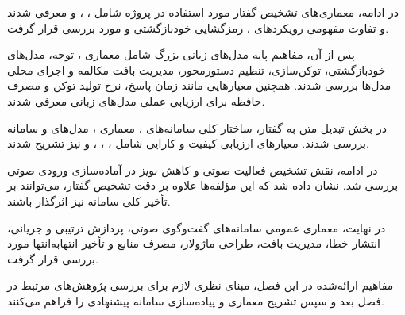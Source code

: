 در ادامه، معماری‌های تشخیص گفتار مورد استفاده در پروژه شامل
، ، 
و  معرفی شدند و تفاوت مفهومی
رویکردهای ، رمزگشایی خودبازگشتی و
 مورد بررسی قرار گرفت.

پس از آن، مفاهیم پایه مدل‌های زبانی بزرگ شامل معماری
، توجه، مدل‌های خودبازگشتی، توکن‌سازی،
تنظیم دستورمحور، مدیریت بافت مکالمه و اجرای محلی مدل‌ها
بررسی شدند.
همچنین معیارهایی مانند زمان پاسخ، نرخ تولید توکن و مصرف
حافظه برای ارزیابی عملی مدل‌های زبانی معرفی شدند.

در بخش تبدیل متن به گفتار، ساختار کلی سامانه‌های ،
معماری ، مدل‌های  و سامانه 
بررسی شدند.
معیارهای ارزیابی کیفیت و کارایی شامل ، ،
،  و  نیز تشریح شدند.

در ادامه، نقش تشخیص فعالیت صوتی و کاهش نویز در آماده‌سازی
ورودی صوتی بررسی شد.
نشان داده شد که این مؤلفه‌ها علاوه بر دقت تشخیص گفتار،
می‌توانند بر تأخیر کلی سامانه نیز اثرگذار باشند.

در نهایت، معماری عمومی سامانه‌های گفت‌وگوی صوتی،
پردازش ترتیبی و جریانی، انتشار خطا، مدیریت بافت،
طراحی ماژولار، مصرف منابع و تأخیر انتهابه‌انتها مورد بررسی
قرار گرفت.

مفاهیم ارائه‌شده در این فصل، مبنای نظری لازم برای بررسی
پژوهش‌های مرتبط در فصل بعد و سپس تشریح معماری و پیاده‌سازی
سامانه پیشنهادی را فراهم می‌کنند.
